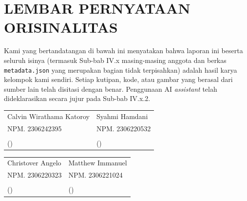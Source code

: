 \documentclass[11pt,a4paper,oneside]{report}
\begin{document}
\chapter*{LEMBAR PERNYATAAN ORISINALITAS}

Kami yang bertandatangan di bawah ini menyatakan bahwa laporan ini beserta seluruh isinya (termasuk Sub-bab IV.x masing-masing anggota dan berkas \texttt{metadata.json} yang merupakan bagian tidak terpisahkan) adalah hasil karya kelompok kami sendiri. Setiap kutipan, kode, atau gambar yang berasal dari sumber lain telah disitasi dengan benar. Penggunaan AI \textit{assistant} telah dideklarasikan secara jujur pada Sub-bab IV.x.2.

\vspace{1.5cm}

\noindent
\begin{tabular}{p{}p{}}
\centering Calvin Wirathama Katoroy & \centering Syahmi Hamdani \tabularnewline
\centering NPM. 2306242395 & \centering NPM. 2306220532 \tabularnewline
\vspace{1.5cm} & \vspace{1.5cm} \tabularnewline
\centering (\hspace{4cm}) & \centering (\hspace{4cm}) \tabularnewline
\end{tabular}

\vspace{1cm}

\noindent
\begin{tabular}{p{}p{}}
\centering Christover Angelo & \centering Matthew Immanuel \tabularnewline
\centering NPM. 2306220323 & \centering NPM. 2306221024 \tabularnewline
\vspace{1.5cm} & \vspace{1.5cm} \tabularnewline
\centering (\hspace{4cm}) & \centering (\hspace{4cm}) \tabularnewline
\end{tabular}

\tableofcontents
\listoffigures
\listoftables
\end{document}
